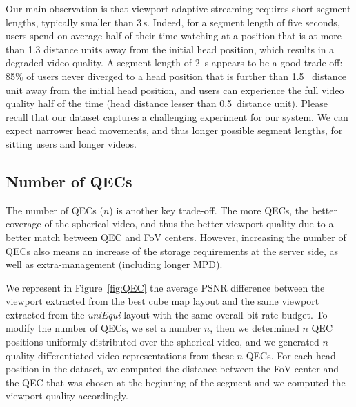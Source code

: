 Our main observation is that viewport-adaptive streaming requires
short segment lengths, typically smaller than 3\,s. Indeed, for a
segment length of five seconds, users spend on average half of their
time watching at a position that is at more than 1.3 distance units
away from the initial head position, which results in a degraded video
quality. A segment length of \SI{2}{\second} appears to be a good trade-off:
85\% of
users never diverged to a head position that is further than 1.5~
distance unit away from the initial head position, and users can experience the full
video quality half of the time (head distance lesser than 0.5~distance unit). Please recall that
our dataset captures a challenging experiment
for our system. We can expect narrower head movements,
and thus longer possible segment lengths, for sitting users and longer
videos.


\subsection{Number of \acp{QEC}}

The number of QECs ($n$) is another key trade-off. The more QECs, the better coverage
of the spherical video, and thus the better viewport quality due to a better match
between QEC and FoV centers. However, increasing the number of QECs also means an increase
of the storage requirements
at the server side, as well as extra-management (including longer \ac{MPD}).

We represent in Figure~\ref{fig:QEC} the average \ac{PSNR} difference between
the viewport extracted from the best cube map layout and the same viewport extracted from
the \emph{uniEqui} layout with the same overall bit-rate budget. To modify the number of QECs,
we set a number $n$, then we determined $n$ QEC positions uniformly distributed over the 
spherical video, and we generated $n$ quality-differentiated video representations from these $n$ QECs.
For each head position in the dataset, we computed the distance between the
FoV center and the QEC that was chosen at the beginning of the segment and we computed
the viewport quality accordingly.
%
%



